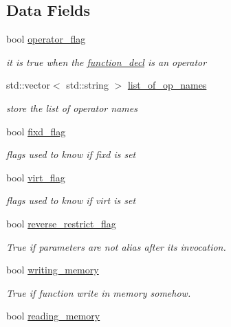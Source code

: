 \subsection*{Data Fields}
\begin{DoxyCompactItemize}
\item 
bool \hyperlink{structfunction__decl_a196f8d7f98a53b4c2c28763a12b0c979}{operator\+\_\+flag}
\begin{DoxyCompactList}\small\item\em it is true when the \hyperlink{structfunction__decl}{function\+\_\+decl} is an operator \end{DoxyCompactList}\item 
std\+::vector$<$ std\+::string $>$ \hyperlink{structfunction__decl_aaca92cfb750abe4017ad73a76d354ca0}{list\+\_\+of\+\_\+op\+\_\+names}
\begin{DoxyCompactList}\small\item\em store the list of operator names \end{DoxyCompactList}\item 
bool \hyperlink{structfunction__decl_ada7d104f1e74ed19d470d9913bd4df4f}{fixd\+\_\+flag}
\begin{DoxyCompactList}\small\item\em flags used to know if fixd is set \end{DoxyCompactList}\item 
bool \hyperlink{structfunction__decl_a9edfefe691893d0542c68e7d35212286}{virt\+\_\+flag}
\begin{DoxyCompactList}\small\item\em flags used to know if virt is set \end{DoxyCompactList}\item 
bool \hyperlink{structfunction__decl_a27032f0497756b6df0d2c1a7f5632051}{reverse\+\_\+restrict\+\_\+flag}
\begin{DoxyCompactList}\small\item\em True if parameters are not alias after its invocation. \end{DoxyCompactList}\item 
bool \hyperlink{structfunction__decl_a25ca1390c712916c74c4ec4eaf8a4043}{writing\+\_\+memory}
\begin{DoxyCompactList}\small\item\em True if function write in memory somehow. \end{DoxyCompactList}\item 
bool \hyperlink{structfunction__decl_a5d305fdaae62e89a09ae7b605132f976}{reading\+\_\+memory}

\end{DoxyCompactItemize}
